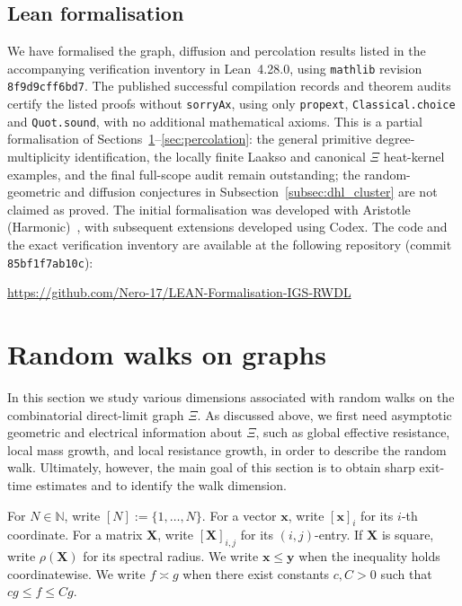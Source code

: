 \documentclass{article}
\theoremstyle{plain}
\theoremstyle{definition}
\begin{document}
\subsection{Lean formalisation}\label{subsec:formalisation}
\begingroup\color{red}
We have formalised the graph, diffusion and percolation results listed in the accompanying verification inventory in Lean~4.28.0, using \texttt{mathlib} revision \texttt{8f9d9cff6bd7}.
The published successful compilation records and theorem audits certify the listed proofs without \texttt{sorryAx}, using only \texttt{propext}, \texttt{Classical.choice} and \texttt{Quot.sound}, with no additional mathematical axioms.
This is a partial formalisation of Sections~\ref{sec:random_walks}--\ref{sec:percolation}: the general primitive degree-multiplicity identification, the locally finite Laakso and canonical $\Xi$ heat-kernel examples, and the final full-scope audit remain outstanding; the random-geometric and diffusion conjectures in Subsection~\ref{subsec:dhl_cluster} are not claimed as proved.
The initial formalisation was developed with Aristotle (Harmonic)~\cite{achim2025aristotle}, with subsequent extensions developed using Codex.
The code and the exact verification inventory are available at the following repository (commit \texttt{85bf1f7ab10c}):
\begin{center}
\footnotesize\url{https://github.com/Nero-17/LEAN-Formalisation-IGS-RWDL}
\end{center}
\endgroup

\section{Random walks on graphs}\label{sec:random_walks}

In this section we study various dimensions associated with random walks on the combinatorial direct-limit graph $\Xi$.
As discussed above, we first need asymptotic geometric and electrical information about $\Xi$, such as global effective resistance, local mass growth, and local resistance growth, in order to describe the random walk.
Ultimately, however, the main goal of this section is to obtain sharp exit-time estimates and to identify the walk dimension.

For $N\in\mathbb N$, write $[N]:=\{1,\dots,N\}$.
For a vector $\mathbf x$, write $[\mathbf x]_i$ for its $i$-th coordinate.
For a matrix $\mathbf X$, write $[\mathbf X]_{i,j}$ for its $(i,j)$-entry.
If $\mathbf X$ is square, write $\rho(\mathbf X)$ for its spectral radius.
We write $\mathbf x\le \mathbf y$ when the inequality holds coordinatewise.
We write $f\asymp g$ when there exist constants $c,C>0$ such that $cg\le f\le Cg$.
\end{document}
